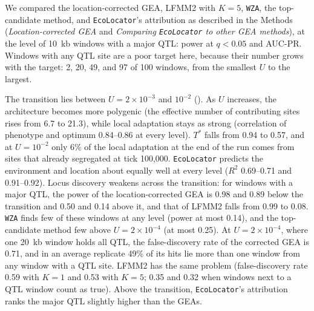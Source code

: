 \documentclass[]{article}
\newcommand{\ecolocator}{\texttt{EcoLocator}\xspace}
\begin{document}
We compared the location-corrected GEA, LFMM2 with $K = 5$,
\texttt{WZA}, the top-candidate method,
and \ecolocator's attribution
as described in the Methods
(\textit{Location-corrected GEA} and \textit{Comparing \ecolocator to other GEA methods}),
at the level of 10~kb windows with a major QTL:
power at $q < 0.05$ and AUC-PR.
Windows with any QTL site are a poor target here,
because their number grows with the target:
2, 20, 49, and 97 of 100 windows, from the smallest $U$ to the largest.

The transition lies between $U = 2 \times 10^{-3}$ and $10^{-2}$
().
As $U$ increases, the architecture becomes more polygenic
(the effective number of contributing sites rises from 6.7 to 21.3),
while local adaptation stays as strong
(correlation of phenotype and optimum 0.84--0.86 at every level).
$T^*$ falls from 0.94 to 0.57,
and at $U = 10^{-2}$ only 6\% of the local adaptation at the end of the run
comes from sites that already segregated at tick 100,000.
\ecolocator predicts the environment and location about equally well
at every level
($R^2$ 0.69--0.71 and 0.91--0.92).
Locus discovery weakens across the transition:
for windows with a major QTL,
the power of the location-corrected GEA is 0.98 and 0.89
below the transition and 0.50 and 0.14 above it,
and that of LFMM2 falls from 0.99 to 0.08.
\texttt{WZA} finds few of these windows at any level (power at most 0.14),
and the top-candidate method few above $U = 2 \times 10^{-4}$
(at most 0.25).
At $U = 2 \times 10^{-4}$, where one 20~kb window holds all QTL,
the false-discovery rate of the corrected GEA is 0.71,
and in an average replicate 49\% of its hits lie more than one window
from any window with a QTL site.
LFMM2 has the same problem
(false-discovery rate 0.59 with $K = 1$ and 0.53 with $K = 5$;
0.35 and 0.32 when windows next to a QTL window count as true).
Above the transition, \ecolocator's attribution ranks the major QTL
slightly higher than the GEAs.
\end{document}
